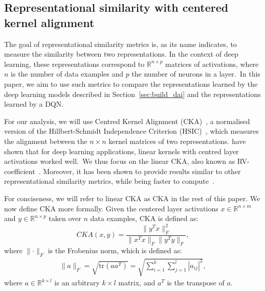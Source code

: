 \documentclass[twoside,11pt]{article}
\begin{document}
\subsection{Representational similarity with centered kernel alignment}\label{ssec:similarity}
The goal of representational similarity metrics is, as its name indicates, to measure the similarity between two representations.
In the context of deep learning, these representations correspond to $\mathbb{R}^{n \times p}$ matrices of activations, where
$n$ is the number of data examples and $p$ the number of neurons in a layer.~In this paper, we aim to use such metrics to compare the representations learned by the deep learning models described in Section~\ref{sec:build_dai} and the
representations learned by a DQN.

For our analysis, we will use Centred Kernel Alignment (CKA)~\citep{Cortes2012,Cristianini2002}, a normalised version of the Hillbert-Schmidt Independence Criterion (HSIC)~\citep{Gretton2005}, which measures the alignment between the $n \times n$ kernel matrices of two representations. \citet{Kornblith2019} have shown that for deep learning applications, linear kernels with centred layer activations worked well.~We thus focus on the linear CKA, also known as RV-coefficient~\citep{Robert1976}. Moreover, it has been shown to provide results similar to other representational similarity metrics, while being faster to compute~\citep{Bonheme2022}.

For conciseness, we will refer to linear CKA as CKA in the rest of this paper.
We now define CKA more formally. Given the centered layer activations $x \in \mathbb{R}^{n \times m}$ and $y \in \mathbb{R}^{n \times p}$ taken over $n$ data examples, CKA is defined as:
\begin{equation*}
    CKA(x, y) = \frac{\lVert y^Tx \rVert_F^2}{\lVert x^Tx \rVert_F\lVert y^Ty \rVert_F},
\end{equation*}
where $\lVert{\cdot}\rVert_F$ is the Frobenius norm, which is defined as:
\begin{align*}
\lVert{a}\rVert_F = \sqrt{\text{tr}(aa^T)} = \sqrt{\sum_{i=1}^k\sum_{j=1}^l |a_{ij}|^2},
\end{align*}
where $a \in \mathbb{R}^{k\times l}$ is an arbitrary $k \times l$ matrix, and $a^T$ is the transpose of $a$.
\end{document}
